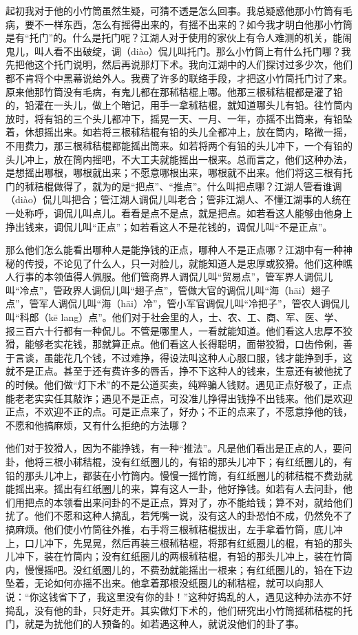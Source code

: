 \documentclass[12pt,UTF8]{ctexbook}
\begin{document}
起初我对于他的小竹筒虽然生疑，可猜不透是怎么回事。我总疑惑他那小竹筒有毛病，要不一样东西，怎么有摇得出来的，有摇不出来的？如今我才明白他那小竹筒是有“托门”的。什么是托门呢？江湖人对于使用的家伙上有令人难测的机关，能闹鬼儿，叫人看不出破绽，调（diào）侃儿叫托门。那么小竹筒上有什么托门哪？我先把他这个托门说明，然后再说那灯下术。我向江湖中的人们探讨过多少次，他们都不肯将个中黑幕说给外人。我费了许多的联络手段，才把这小竹筒托门讨了来。原来他那竹筒没有毛病，有鬼儿都在那秫秸棍上哪。他那三根秫秸棍都是灌了铅的，铅灌在一头儿，做上个暗记，用手一拿秫秸棍，就知道哪头儿有铅。往竹筒内放时，将有铅的三个头儿都冲下，摇晃一天、一月、一年，亦摇不出筒来，有铅坠着，休想摇出来。如若将三根秫秸棍有铅的头儿全都冲上，放在筒内，略微一摇，不用费力，那三根秫秸棍都能摇出筒来。如若将两个有铅的头儿冲下，一个有铅的头儿冲上，放在筒内摇吧，不大工夫就能摇出一根来。总而言之，他们这种办法，是想摇出哪根，哪根就出来；不愿意哪根出来，哪根就不出来。他们将这三根有托门的秫秸棍做得了，就为的是“把点”、“推点”。什么叫把点哪？江湖人管看谁调（diào）侃儿叫把合；管江湖人调侃儿叫老合；管非江湖人、不懂江湖事的人统在一处称呼，调侃儿叫点儿。看看是点不是点，就是把点。如若看这人能够由他身上挣出钱来，调侃儿叫“正点”；如若看这人不是花钱的，调侃儿叫“不是正点”。

那么他们怎么能看出哪种人是能挣钱的正点，哪种人不是正点哪？江湖中有一种神秘的传授，不论见了什么人，只一对脸儿，就能知道人是忠厚或狡猾。他们这种瞧人行事的本领值得人佩服。他们管商界人调侃儿叫“贸易点”，管军界人调侃儿叫“冷点”，管政界人调侃儿叫“翅子点”，管做大官的调侃儿叫“海（hāi）翅子点”，管军人调侃儿叫“海（hāi）冷”，管小军官调侃儿叫“冷把子”，管农人调侃儿叫“科郎（kē lang）点”。他们对于社会里的人，士、农、工、商、军、医、学、报三百六十行都有一种侃儿。不管是哪里人，一看就能知道。他们看这人忠厚不狡猾，能够老实花钱，那就算正点。他们看这人长得聪明，面带狡猾，口齿伶俐，善于言谈，虽能花几个钱，不过难挣，得设法叫这种人心服口服，钱才能挣到手，这就不是正点。甚至于还有费许多的唇舌，挣不下这种人的钱来，生意还有被他扰了的时候。他们做“灯下术”的不是公道买卖，纯粹骗人钱财。遇见正点好极了，正点能老老实实任其敲诈；遇见不是正点，可没准儿挣得出钱挣不出钱来。他们是欢迎正点，不欢迎不正的点。可是正点来了，好办；不正的点来了，不愿意挣他的钱，不愿和他搞麻烦，又有什么拒绝的方法哪？

他们对于狡猾人，因为不能挣钱，有一种“推法”。凡是他们看出是正点的人，要问卦，他将三根小秫秸棍，没有红纸圈儿的，有铅的那头儿冲下；有红纸圈儿的，有铅的那头儿冲上，都装在小竹筒内。慢慢一摇竹筒，有红纸圈儿的秫秸棍不费劲就能摇出来。摇出有红纸圈儿的来，算有这人一卦，他好挣钱。如若有人去问卦，他们用把点的本领看出来问卦的不是正点，算对了，亦不能给钱；算不对，就给他们扰了。他们不愿和这种人搞乱，若凭嘴一说，没有这人的卦恐怕不成，仍然免不了搞麻烦。他们使小竹筒往外推，右手将三根秫秸棍拔出，左手拿着竹筒，底儿冲上，口儿冲下，先晃晃，然后再装三根秫秸棍，将那有红纸圈儿的棍，有铅的那头儿冲下，装在竹筒内；没有红纸圈儿的两根秫秸棍，有铅的那头儿冲上，装在竹筒内，慢慢摇吧。没红纸圈儿的，不费劲就能摇出一根来；有红纸圈儿的，铅在下边坠着，无论如何亦摇不出来。他拿着那根没纸圈儿的秫秸棍，就可以向那人说：“你这钱省下了，我这里没有你的卦！”这种好捣乱的人，遇见这种办法亦不好捣乱，没有他的卦，只好走开。其实做灯下术的，他们研究出小竹筒摇秫秸棍的托门，就是为扰他们的人预备的。如若遇这种人，就说没他们的卦了事。
\end{document}
